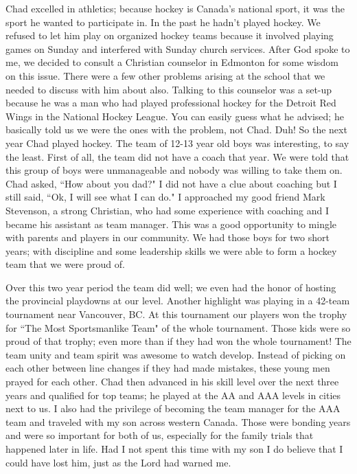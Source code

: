 \documentclass[oneside,12pt]{book}
\begin{document}
Chad excelled in athletics; because hockey is Canada's national sport, it was the sport he wanted to participate in. In the past he hadn't played hockey. We refused to let him play on organized hockey teams because it involved playing games on Sunday and interfered with Sunday church services. After God spoke to me, we decided to consult a Christian counselor in Edmonton for some wisdom on this issue. There were a few other problems arising at the school that we needed to discuss with him about also. Talking to this counselor was a set-up because he was a man who had played professional hockey for the Detroit Red Wings in the National Hockey League. You can easily guess what he advised; he basically told us we were the ones with the problem, not Chad. Duh! So the next year Chad played hockey. The team of 12-13 year old boys was interesting, to say the least. First of all, the team did not have a coach that year. We were told that this group of boys were unmanageable and nobody was willing to take them on. Chad asked, ``How about you dad?" I did not have a clue about coaching but I still said, ``Ok, I will see what I can do." I approached my good friend Mark Stevenson, a strong Christian, who had some experience with coaching and I became his assistant as team manager. This was a good opportunity to mingle with parents and players in our community. We had those boys for two short years; with discipline and some leadership skills we were able to form a hockey team that we were proud of.

Over this two year period the team did well; we even had the honor of hosting the provincial playdowns at our level. Another highlight was playing in a 42-team tournament near Vancouver, BC. At this tournament our players won the trophy for ``The Most Sportsmanlike Team" of the whole tournament. Those kids were so proud of that trophy; even more than if they had won the whole tournament! The team unity and team spirit was awesome to watch develop. Instead of picking on each other between line changes if they had made mistakes, these young men prayed for each other. Chad then advanced in his skill level over the next three years and qualified for top teams; he played at the AA and AAA levels in cities next to us. I also had the privilege of becoming the team manager for the AAA team and traveled with my son across western Canada. Those were bonding years and were so important for both of us, especially for the family trials that happened later in life. Had I not spent this time with my son I do believe that I could have lost him, just as the Lord had warned me.
\end{document}
